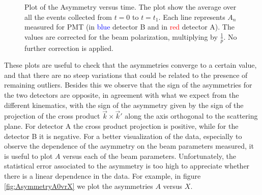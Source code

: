 \begin{figure}[hbtp]
\centering
{}
\caption{Plot of the Asymmetry versus time. The plot show the average over all the events collected from $t = 0$ to $t = t_{1}$. Each line represents $A_{n}$ measured for  PMT (in \textcolor{blue}{blue} detector B and in \textcolor{red}{red} detector A). The values are corrected for the beam polarization, multiplying by $\frac{1}{p}$. No further correction is applied.}
\label{fig:AsymOverTime}
\end{figure}

These plots are useful to check that the asymmetries converge to a certain value, and that there are no steep variations that could be related to the presence of remaining outliers. Besides this we observe that the sign of the asymmetries for the two detectors are opposite, in agreement with what we expect from the different kinematics, with the sign of the asymmetry given by the sign of the projection of the cross product $\vec{k} \times \vec{k}'$ along the axis orthogonal to the scattering plane. For detector A the cross product projection is positive, while for the detector B it is negative.
For a better visualization of the data, especially to observe the dependence of the asymmetry on the beam parameters measured, it is useful to plot $A$ versus each of the beam parameters. Unfortunately, the statistical error associated to the asymmetry is too high to appreciate whether there is a linear dependence in the data. For example, in figure \ref{fig:AsymmetryA0vrX} we plot the asymmetries $A$ versus $X$.

